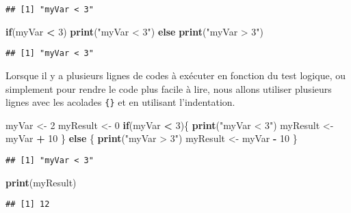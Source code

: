 \documentclass[]{book}
\newenvironment{Shaded}{\begin{snugshade}}{\end{snugshade}}
\newcommand{\KeywordTok}[1]{\textcolor[rgb]{0.13,0.29,0.53}{\textbf{#1}}}
\newcommand{\DecValTok}[1]{\textcolor[rgb]{0.00,0.00,0.81}{#1}}
\newcommand{\StringTok}[1]{\textcolor[rgb]{0.31,0.60,0.02}{#1}}
\newcommand{\ControlFlowTok}[1]{\textcolor[rgb]{0.13,0.29,0.53}{\textbf{#1}}}
\newcommand{\OperatorTok}[1]{\textcolor[rgb]{0.81,0.36,0.00}{\textbf{#1}}}
\newcommand{\NormalTok}[1]{#1}
\theoremstyle{definition}
\theoremstyle{definition}
\theoremstyle{definition}
\theoremstyle{remark}
\begin{document}
\begin{verbatim}
## [1] "myVar < 3"
\end{verbatim}

\begin{Shaded}
\begin{Highlighting}[]
\ControlFlowTok{if}\NormalTok{(myVar }\OperatorTok{<}\StringTok{ }\DecValTok{3}\NormalTok{) }\KeywordTok{print}\NormalTok{(}\StringTok{"myVar < 3"}\NormalTok{) }\ControlFlowTok{else} \KeywordTok{print}\NormalTok{(}\StringTok{"myVar > 3"}\NormalTok{)}
\end{Highlighting}
\end{Shaded}

\begin{verbatim}
## [1] "myVar < 3"
\end{verbatim}

Lorsque il y a plusieurs lignes de codes à exécuter en fonction du test
logique, ou simplement pour rendre le code plus facile à lire, nous
allons utiliser plusieurs lignes avec les acolades \texttt{\{\}} et en
utilisant l'indentation.

\begin{Shaded}
\begin{Highlighting}[]
\NormalTok{myVar <-}\StringTok{ }\DecValTok{2}
\NormalTok{myResult <-}\StringTok{ }\DecValTok{0}
\ControlFlowTok{if}\NormalTok{(myVar }\OperatorTok{<}\StringTok{ }\DecValTok{3}\NormalTok{)\{}
  \KeywordTok{print}\NormalTok{(}\StringTok{"myVar < 3"}\NormalTok{)}
\NormalTok{  myResult <-}\StringTok{ }\NormalTok{myVar }\OperatorTok{+}\StringTok{ }\DecValTok{10}
\NormalTok{\} }\ControlFlowTok{else}\NormalTok{ \{}
  \KeywordTok{print}\NormalTok{(}\StringTok{"myVar > 3"}\NormalTok{)}
\NormalTok{  myResult <-}\StringTok{ }\NormalTok{myVar }\OperatorTok{-}\StringTok{ }\DecValTok{10}
\NormalTok{\}}
\end{Highlighting}
\end{Shaded}

\begin{verbatim}
## [1] "myVar < 3"
\end{verbatim}

\begin{Shaded}
\begin{Highlighting}[]
\KeywordTok{print}\NormalTok{(myResult)}
\end{Highlighting}
\end{Shaded}

\begin{verbatim}
## [1] 12
\end{verbatim}
\end{document}

